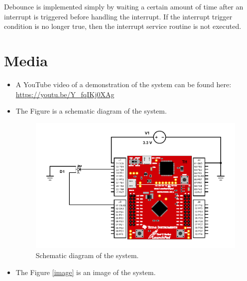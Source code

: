 \documentclass{article}
\begin{document}
Debounce is implemented simply by waiting a certain amount of
time after an interrupt is triggered before handling the
interrupt. If the interrupt trigger condition is no longer
true, then the interrupt service routine is not executed.

\section{Media}
\begin{itemize}
\item A YouTube video of a demonstration of the system can be
found here: \url{https://youtu.be/Y_fqIKj0XAg}
\item The Figure %
is a schematic diagram of the system.
\begin{figure}[H]
    \centering
    \includegraphics[width=\textwidth]{Images/schemeit-project}
    \caption{Schematic diagram of the system.}
    \label{diagram:schematic}
\end{figure}
\item The Figure \ref{image} is an image of the system.
\begin{figure}[H]
    \centering

\end{figure}
\end{itemize}
\end{document}
